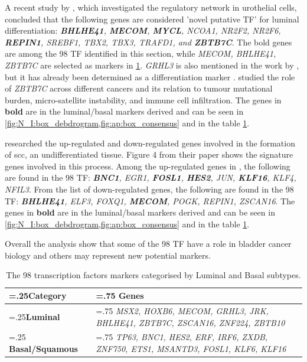 A recent study by \citet{Ramal2024-ha}, which investigated the regulatory network in urothelial cells, concluded that the following genes are considered 'novel putative TF' for luminal differentiation: \textit{\textbf{BHLHE41}, \textbf{MECOM}, \textbf{MYCL}, NCOA1, NR2F2, NR2F6, \textbf{REPIN1}, SREBF1, TBX2, TBX3, TRAFD1, and \textbf{ZBTB7C}}. The bold genes are among the 98 TF identified in this section, while \textit{MECOM, BHLHE41, ZBTB7C} are selected as markers in \cref{tab:N_I:genes_lum_basal}. \textit{GRHL3} is also mentioned in the work by \citet{Ramal2024-ha}, but it has already been determined as a differentiation marker \citep{Bock2014-zy}. \citet{Chen2021-tc} studied the role of \textit{ZBTB7C} across different cancers and its relation to tumour mutational burden, micro-satellite instability, and immune cell infiltration. The genes in \textbf{bold} are in the luminal/basal markers derived and can be seen in \cref{fig:N_I:box_debdrogram,fig:ap:box_consensus} and in the table \cref{tab:N_I:genes_lum_basal}.

\citet{Hurst2022-sp} researched the up-regulated and down-regulated genes involved in the formation of \acrfull{scc}, an undifferentiated tissue. Figure 4 from their paper shows the signature genes involved in this process. Among the up-regulated genes in \citet{Hurst2022-sp}, the following are found in the 98 TF: \textit{\textbf{BNC1}, EGR1, \textbf{FOSL1}, \textbf{HES2}, JUN, \textbf{KLF16}, KLF4, NFIL3}. From the list of down-regulated genes, the following are found in the 98 TF: \textit{\textbf{BHLHE41}, ELF3, FOXQ1, \textbf{MECOM}, POGK, REPIN1, ZSCAN16}. The genes in \textbf{bold} are in the luminal/basal markers derived and can be seen in \cref{fig:N_I:box_debdrogram,fig:ap:box_consensus} and in the table \cref{tab:N_I:genes_lum_basal}.

% 
Overall the analysis show that some of the 98 TF have a role in bladder cancer biology and others may represent new potential markers.

\begin{table}[!htb]
  \centering
  \small
  \begin{tabularx}{\textwidth}{>{\hsize=.25\hsize}X|>{\hsize=.75\hsize}X}
    \toprule
    \textbf{Category} & \textbf{Genes} \\
    \midrule
    \textbf{Luminal} & \textit{MSX2, HOXB6, MECOM, GRHL3, JRK, BHLHE41, ZBTB7C, ZSCAN16, ZNF224, ZBTB10} \\
    \midrule
    \textbf{Basal/Squamous} & \textit{TP63, BNC1, HES2, ERF, IRF6, ZXDB, ZNF750, ETS1, MSANTD3, FOSL1, KLF6, KLF16} \\
    \bottomrule
  \end{tabularx}
  \caption[Luminal and Basal markers from the 98 TF]{The 98 transcription factors markers categorised by Luminal and Basal subtypes.} %
  \label{tab:N_I:genes_lum_basal}
\end{table}


